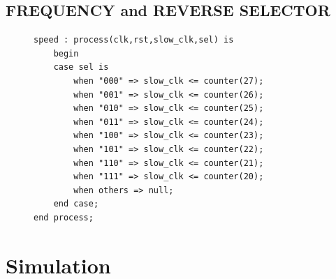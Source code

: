 \documentclass[11pt, a4paper]{article}
\begin{document}
\subsection{FREQUENCY and REVERSE SELECTOR}
\begin{figure}[h!]
    \begin{lstlisting}[style=vhdl]
speed : process(clk,rst,slow_clk,sel) is
    begin
    case sel is
        when "000" => slow_clk <= counter(27);
        when "001" => slow_clk <= counter(26);
        when "010" => slow_clk <= counter(25);
        when "011" => slow_clk <= counter(24);
        when "100" => slow_clk <= counter(23);
        when "101" => slow_clk <= counter(22);
        when "110" => slow_clk <= counter(21);
        when "111" => slow_clk <= counter(20);
        when others => null;
    end case;
end process;\end{lstlisting}
    \caption{\label{}}
\end{figure}

\section{Simulation}
\end{document}
